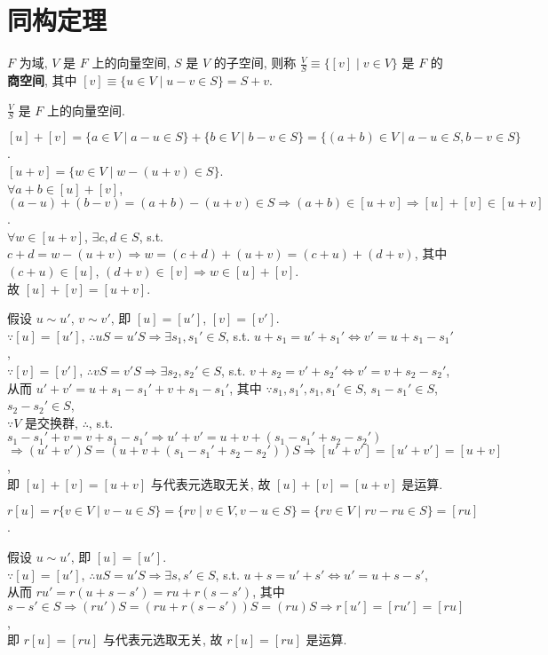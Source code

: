 \documentclass{note}
\begin{document}
\fi
\chapter{同构定理}
\begin{df}[商空间]
    $F$ 为域, $V$ 是 $F$ 上的向量空间, $S$ 是 $V$ 的子空间, 则称 $\frac{V}{S}\equiv\{[v]\mid v\in V\}$ 是 $F$ 的\textbf{商空间}, 其中 $[v]\equiv\{u\in V\mid u-v\in S\}=S+v$.
\end{df}

$\frac{V}{S}$ 是 $F$ 上的向量空间.
\begin{pf}
    $[u]+[v]=\{a\in V\mid a-u\in S\}+\{b\in V\mid b-v\in S\}=\{(a+b)\in V\mid a-u\in S,b-v\in S\}$.\\
    $[u+v]=\{w\in V\mid w-(u+v)\in S\}$.\\
    $\forall a+b\in [u]+[v]$, $(a-u)+(b-v)=(a+b)-(u+v)\in S\Longrightarrow(a+b)\in[u+v]\Longrightarrow[u]+[v]\in[u+v]$.\\
    $\forall w\in[u+v]$, $\exists c,d\in S$, s.t. $c+d=w-(u+v)\Longrightarrow w=(c+d)+(u+v)=(c+u)+(d+v)$, 其中 $(c+u)\in[u]$, $(d+v)\in[v]\Longrightarrow w\in[u]+[v]$.\\
    故 $[u]+[v]=[u+v]$.

    假设 $u\sim u'$, $v\sim v'$, 即 $[u]=[u']$, $[v]=[v']$.\\
    $\because[u]=[u']$, $\therefore uS=u'S\Longrightarrow\exists s_1,s_1'\in S$, s.t. $u+s_1=u'+s_1'\Longleftrightarrow v'=u+s_1-s_1'$,\\
    $\because[v]=[v']$, $\therefore vS=v'S\Longrightarrow\exists s_2,s_2'\in S$, s.t. $v+s_2=v'+s_2'\Longleftrightarrow v'=v+s_2-s_2'$,\\
    从而 $u'+v'=u+s_1-s_1'+v+s_1-s_1'$, 其中 $\because s_1,s_1',s_1,s_1'\in S$, $s_1-s_1'\in S$, $s_2-s_2'\in S$,\\
    $\because V$ 是交换群, $\therefore$, s.t. $s_1-s_1'+v=v+s_1-s_1'\Longrightarrow u'+v'=u+v+(s_1-s_1'+s_2-s_2')$\\
    $\Longrightarrow(u'+v')S=(u+v+(s_1-s_1'+s_2-s_2'))S\Longrightarrow[u'+v']=[u'+v']=[u+v]$,\\
    即 $[u]+[v]=[u+v]$ 与代表元选取无关, 故 $[u]+[v]=[u+v]$ 是运算.

    $r[u]=r\{v\in V\mid v-u\in S\}=\{rv\mid v\in V,v-u\in S\}=\{rv\in V\mid rv-ru\in S\}=[ru]$.

    假设 $u\sim u'$, 即 $[u]=[u']$.\\
    $\because[u]=[u']$, $\therefore uS=u'S\Longrightarrow\exists s,s'\in S$, s.t. $u+s=u'+s'\Longleftrightarrow u'=u+s-s'$,\\
    从而 $ru'=r(u+s-s')=ru+r(s-s')$, 其中 $s-s'\in S\Longrightarrow(ru')S=(ru+r(s-s'))S=(ru)S\Longrightarrow r[u']=[ru']=[ru]$,\\
    即 $r[u]=[ru]$ 与代表元选取无关, 故 $r[u]=[ru]$ 是运算.


\end{pf}
\end{document}
